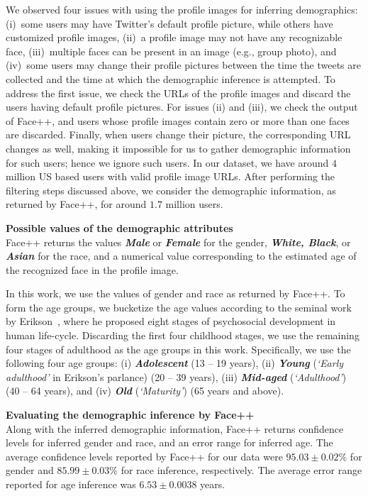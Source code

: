 \documentclass[letterpaper]{article}
\begin{document}
We observed four issues with using the profile images for inferring
demographics: 
(i)~some users may have Twitter's default profile picture, while
others have customized profile images, 
(ii)~a profile image may not have any recognizable face, 
(iii)~multiple faces can be present in
an image (e.g., group photo), and
(iv)~some users may  change their profile pictures between the time the tweets are 
collected and the time at which the demographic inference is attempted. 
To address the first issue, we check the URLs of the profile images and discard the users having default 
profile pictures. For issues (ii) and (iii), we check the output of Face++, and users whose
profile images contain zero or more than one faces are discarded.
Finally, when users change their picture, the corresponding URL changes as well, 
making it impossible for us to gather demographic information for such users;
hence we ignore such users. 
In our dataset, we have around $4$ million US based users with valid profile image URLs. 
After performing the filtering steps discussed above, we consider the demographic
information, as returned by Face++, for around $1.7$ million users. 

\vspace{1mm}
\noindent \textbf{Possible values of the demographic attributes}\\
\noindent
Face++ returns the values \textbf{\textit{Male}} or \textbf{\textit{Female}} for the gender,
\textbf{\textit{White, Black}}, or \textbf{\textit{Asian}} for the race,
and a numerical value corresponding to the estimated age of the recognized face in the profile image.

In this work, we use the values of gender and race as returned by Face++.
To form the age groups, we bucketize the age values according to the seminal
work by Erikson~\cite{erikson1994identity},
where he proposed eight stages of psychosocial development in human life-cycle.
Discarding the first four childhood stages, we use the remaining
four stages of adulthood as the age groups in this work.
Specifically, we use the following four age groups:
(i) \textbf{\textit{Adolescent}} (13 -- 19 years),
(ii) \textbf{\textit{Young}} ({\it `Early adulthood'} in Erikson's parlance) (20 -- 39 years),
(iii) \textbf{\textit{Mid-aged}} ({\it `Adulthood'}) (40 -- 64 years), and
(iv) \textbf{\textit{Old}} ({\it `Maturity'}) (65 years and above).

\vspace{1mm}
\noindent \textbf{Evaluating the demographic inference by Face++ }\\
\noindent
Along with the inferred demographic information, Face++ returns confidence levels for inferred gender and race,
and an error range for inferred age. The average confidence levels reported by Face++ for our data
were $95.03\pm0.02\%$ for gender and $85.99\pm0.03\%$ for race inference, respectively.
The average error range reported for age inference was $6.53\pm0.0038$ years.
\end{document}
